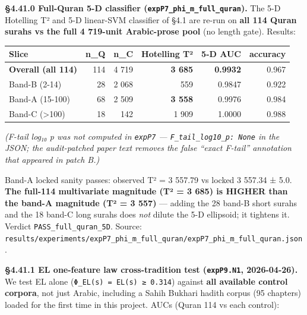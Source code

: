 \documentclass[
]{article}
\newcounter{none} %
\begin{document}
\textbf{§4.41.0 Full-Quran 5-D classifier
(\texttt{expP7\_phi\_m\_full\_quran}).} The 5-D Hotelling T² and 5-D
linear-SVM classifier of §4.1 are re-run on \textbf{all 114 Quran surahs
vs the full 4 719-unit Arabic-prose pool} (no length gate). Results:

{\def\LTcaptype{none} %
\begin{longtable}[]{@{}lrrrrr@{}}
\toprule\noalign{}
Slice & n\_Q & n\_C & Hotelling T² & 5-D AUC & accuracy \\
\midrule\noalign{}
\endhead
\bottomrule\noalign{}
\endlastfoot
\textbf{Overall (all 114)} & 114 & 4 719 & \textbf{3 685} &
\textbf{0.9932} & 0.967 \\
Band-B (2-14) & 28 & 2 068 & 559 & 0.9847 & 0.922 \\
Band-A (15-100) & 68 & 2 509 & \textbf{3 558} & 0.9976 & 0.984 \\
Band-C (\textgreater100) & 18 & 142 & 1 909 & 1.0000 & 0.988 \\
\end{longtable}
}

\emph{(F-tail log₁₀ p was not computed in \texttt{expP7} ---
\texttt{F\_tail\_log10\_p:\ None} in the JSON; the audit-patched paper
text removes the false ``exact F-tail'' annotation that appeared in
patch B.)}

Band-A locked sanity passes: observed T² = 3 557.79 vs locked 3 557.34 ±
5.0. \textbf{The full-114 multivariate magnitude (T² = 3 685) is HIGHER
than the band-A magnitude (T² = 3 557)} --- adding the 28 band-B short
surahs and the 18 band-C long surahs does \emph{not} dilute the 5-D
ellipsoid; it tightens it. Verdict \texttt{PASS\_full\_quran\_5D}.
Source:
\texttt{results/experiments/expP7\_phi\_m\_full\_quran/expP7\_phi\_m\_full\_quran.json}.

\textbf{§4.41.1 EL one-feature law cross-tradition test
(\texttt{expP9.N1}, 2026-04-26).} We test EL alone
(\texttt{Φ\_EL(s)\ =\ EL(s)\ ≥\ 0.314}) against \textbf{all available
control corpora}, not just Arabic, including a Sahih Bukhari hadith
corpus (95 chapters) loaded for the first time in this project. AUCs
(Quran 114 vs each control):
\end{document}
